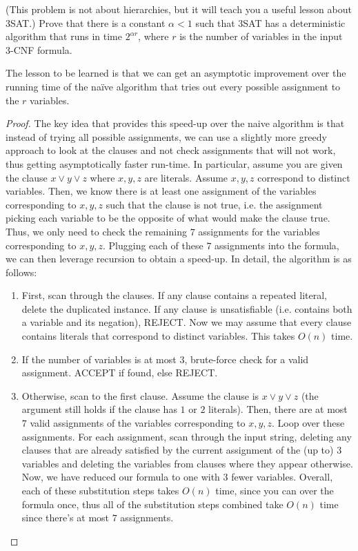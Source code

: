 \documentclass[12pt]{article}
\begin{document}
\newpage 
\begin{problem}{3}
(This problem is not about hierarchies, but it will teach you a useful lesson about 3SAT.) Prove that there is a constant
$\alpha < 1$ such that 3SAT has a deterministic algorithm that runs in time $2^{\alpha r}$, where $r$ is the number of variables in the input
3-CNF formula.

The lesson to be learned is that we can get an asymptotic improvement over the running time of the naïve algorithm that tries out every possible assignment to the $r$ variables.
\end{problem}


\begin{proof}
    The key idea that provides this speed-up over the naive algorithm is that instead of trying all possible assignments, we can use a slightly more greedy approach to look at the clauses and not check assignments that will not work, thus getting asymptotically faster run-time. \bbni
    In particular, assume you are given the clause $x \lor y \lor z$ where $x, y, z$ are literals. Assume $x, y, z$ correspond to distinct variables. Then, we know there is at least one assignment of the variables corresponding to $x, y, z$ such that the clause is not true, i.e. the assignment picking each variable to be the opposite of what would make the clause true. Thus, we only need to check the remaining $7$ assignments for the variables corresponding to $x, y, z$. Plugging each of these $7$ assignments into the formula, we can then leverage recursion to obtain a speed-up. \bbni
    In detail, the algorithm is as follows: 
    \begin{enumerate}
        \item First, scan through the clauses. If any clause contains a repeated literal, delete the duplicated instance. If any clause is unsatisfiable (i.e. contains both a variable and its negation), REJECT. Now we may assume that every clause contains literals that correspond to distinct variables. This takes $O(n)$ time. 
        \item If the number of variables is at most $3$, brute-force check for a valid assignment. ACCEPT if found, else REJECT.
        \item Otherwise, scan to the first clause. Assume the clause is $x \lor y \lor z$ (the argument still holds if the clause has $1$ or $2$ literals). Then, there are at most $7$ valid assignments of the variables corresponding to $x, y, z$. Loop over these assignments. For each assignment, scan through the input string, deleting any clauses that are already satisfied by the current assignment of the (up to) $3$ variables and deleting the variables from clauses where they appear otherwise. Now, we have reduced our formula to one with $3$ fewer variables. Overall, each of these substitution steps takes $O(n)$ time, since you can over the formula once, thus all of the substitution steps combined take $O(n)$ time since there's at most $7$ assignments.

\end{enumerate}
\end{proof}
\end{document}
